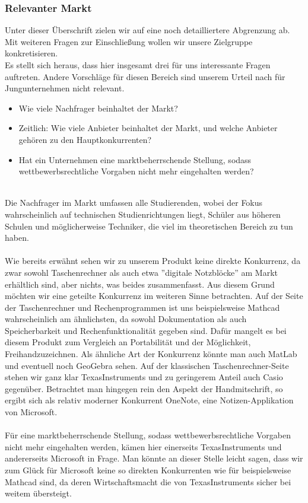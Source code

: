 \subsubsection{Relevanter Markt}
Unter dieser Überschrift zielen wir auf eine noch detailliertere Abgrenzung ab. Mit weiteren Fragen zur Einschließung wollen wir unsere Zielgruppe konkretisieren.\\
Es stellt sich heraus, dass hier insgesamt drei für uns interessante Fragen auftreten. Andere Vorschläge für diesen Bereich sind unserem Urteil nach für Jungunternehmen nicht relevant.\\

\begin{itemize}
	\item Wie viele Nachfrager beinhaltet der Markt?
	\item Zeitlich: Wie viele Anbieter beinhaltet der Markt, und welche Anbieter gehören zu den Hauptkonkurrenten?
	\item Hat ein Unternehmen eine marktbeherrschende Stellung, sodass wettbewerbsrechtliche Vorgaben nicht mehr eingehalten werden?
\end{itemize}
\ \\
Die Nachfrager im Markt umfassen alle Studierenden, wobei der Fokus wahrscheinlich auf technischen Studienrichtungen liegt, Schüler aus höheren Schulen und möglicherweise Techniker, die viel im theoretischen Bereich zu tun haben.\\
\\
Wie bereits erwähnt sehen wir zu unserem Produkt keine direkte Konkurrenz, da zwar sowohl Taschenrechner als auch etwa ''digitale Notzblöcke'' am Markt erhältlich sind, aber nichts, was beides zusammenfasst. Aus diesem Grund möchten wir eine geteilte Konkurrenz im weiteren Sinne betrachten. Auf der Seite der Taschenrechner und Rechenprogrammen ist uns beispielsweise Mathcad wahrscheinlich am ähnlichsten, da sowohl Dokumentation als auch Speicherbarkeit und Rechenfunktionalität gegeben sind. Dafür mangelt es bei diesem Produkt zum Vergleich an Portabilität und der Möglichkeit, Freihandzuzeichnen. Als ähnliche Art der Konkurrenz könnte man auch MatLab und eventuell noch GeoGebra sehen. Auf der klassischen Taschenrechner-Seite stehen wir ganz klar TexasInstruments und zu geringerem Anteil auch Casio gegenüber. Betrachtet man hingegen rein den Aspekt der Handmitschrift, so ergibt sich als relativ moderner Konkurrent OneNote, eine Notizen-Applikation von Microsoft.\\
\\
Für eine marktbeherrschende Stellung, sodass wettbewerbsrechtliche Vorgaben nicht mehr eingehalten werden, kämen hier einerseits TexasInstruments und andererseits Microsoft in Frage. Man könnte an dieser Stelle leicht sagen, dass wir zum Glück für Microsoft keine so direkten Konkurrenten wie für beispielsweise Mathcad sind, da deren Wirtschaftsmacht die von TexasInstruments sicher bei weitem übersteigt.\\

